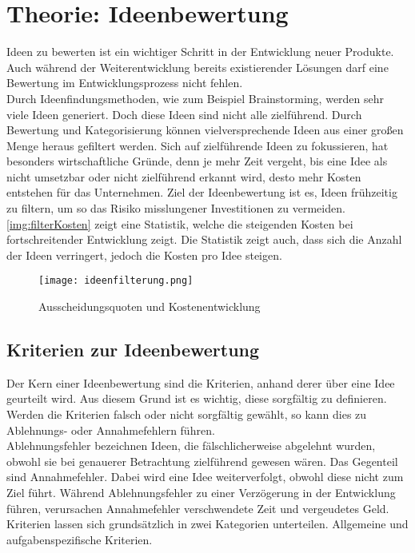 \newpage
\section{Theorie: Ideenbewertung}\label{sec:theorie}
Ideen zu bewerten ist ein wichtiger Schritt in der Entwicklung neuer Produkte. 
Auch während der Weiterentwicklung bereits existierender Lösungen darf eine Bewertung im Entwicklungsprozess nicht fehlen.\\
Durch Ideenfindungsmethoden, wie zum Beispiel Brainstorming, werden sehr viele Ideen generiert. Doch diese Ideen 
sind nicht alle zielführend. 
Durch Bewertung und Kategorisierung können vielversprechende Ideen aus einer großen Menge heraus gefiltert werden. 
Sich auf zielführende Ideen zu fokussieren, hat besonders wirtschaftliche Gründe, denn je mehr Zeit vergeht, bis eine Idee 
als nicht umsetzbar oder nicht zielführend erkannt wird, desto mehr Kosten entstehen für das Unternehmen.
Ziel der Ideenbewertung ist es, Ideen frühzeitig zu filtern, um so das Risiko misslungener Investitionen zu vermeiden.
\cite{grossklaus:2008}\\
\autoref{img:filterKosten} zeigt eine Statistik, welche die steigenden Kosten bei fortschreitender Entwicklung zeigt. Die
Statistik zeigt auch, dass sich die Anzahl der Ideen verringert, jedoch die Kosten pro Idee steigen.
\begin{figure}[h]
	\centering
	\texttt{[image: ideenfilterung.png]}
	\caption{Ausscheidungsquoten und Kostenentwicklung}
	\label{img:filterKosten}
\end{figure}

\subsection{Kriterien zur Ideenbewertung}
Der Kern einer Ideenbewertung sind die Kriterien, anhand derer über eine Idee geurteilt wird.
Aus diesem Grund ist es wichtig, diese sorgfältig zu definieren. Werden die Kriterien falsch oder nicht sorgfältig gewählt,
so kann dies zu Ablehnungs- oder Annahmefehlern führen.\\ 
Ablehnungsfehler bezeichnen Ideen, die fälschlicherweise abgelehnt wurden, obwohl sie bei genauerer Betrachtung 
zielführend gewesen wären. Das Gegenteil sind Annahmefehler. Dabei wird eine Idee weiterverfolgt, obwohl diese nicht zum Ziel führt. 
Während Ablehnungsfehler zu einer Verzögerung in der Entwicklung führen, verursachen Annahmefehler verschwendete Zeit und vergeudetes Geld.
Kriterien lassen sich grundsätzlich in zwei Kategorien unterteilen. Allgemeine und aufgabenspezifische Kriterien.\\

